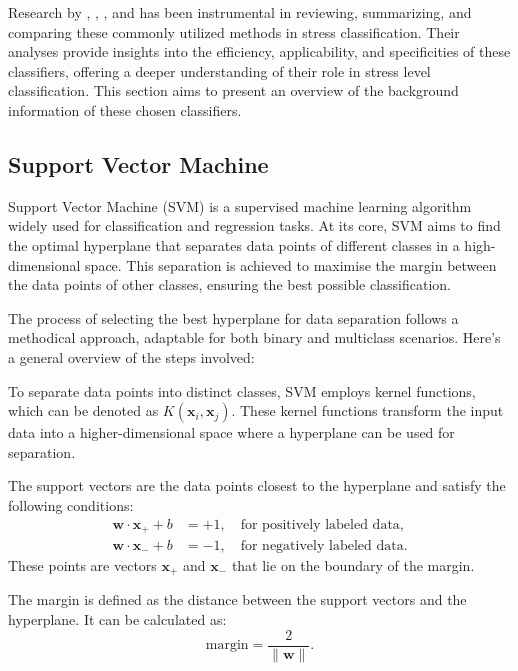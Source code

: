 Research by \textcite{machine}, \textcite{1}, \textcite{review2021}, and \textcite{Sharma2012} has been instrumental in reviewing, summarizing, and comparing these commonly utilized methods in stress classification. Their analyses provide insights into the efficiency, applicability, and specificities of these classifiers, offering a deeper understanding of their role in stress level classification. This section aims to present an overview of the background information of these chosen classifiers.

\subsection*{Support Vector Machine}

Support Vector Machine (SVM) is a supervised machine learning algorithm widely used for classification and regression tasks. At its core, SVM aims to find the optimal hyperplane that separates data points of different classes in a high-dimensional space. This separation is achieved to maximise the margin between the data points of other classes, ensuring the best possible classification.


The process of selecting the best hyperplane for data separation follows a methodical approach, adaptable for both binary and multiclass scenarios. Here's a general overview of the steps involved:

To separate data points into distinct classes, SVM employs kernel functions, which can be denoted as \( K(\mathbf{x}_i, \mathbf{x}_j) \). These kernel functions transform the input data into a higher-dimensional space where a hyperplane can be used for separation.

The support vectors are the data points closest to the hyperplane and satisfy the following conditions:
\begin{align}
    \mathbf{w} \cdot \mathbf{x}_+ + b &= +1, \quad \text{for positively labeled data,} \\
    \mathbf{w} \cdot \mathbf{x}_- + b &= -1, \quad \text{for negatively labeled data.}
\end{align}
These points are vectors \(\mathbf{x}_+\) and \(\mathbf{x}_-\) that lie on the boundary of the margin.

The margin is defined as the distance between the support vectors and the hyperplane. It can be calculated as:
\begin{equation}
    \text{margin} = \frac{2}{\|\mathbf{w}\|}.
\end{equation}

